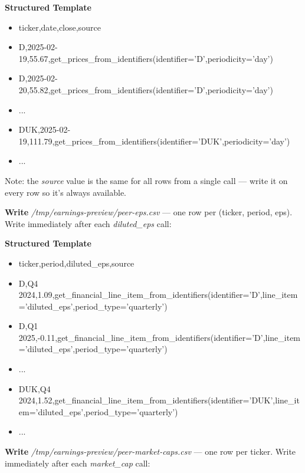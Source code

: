 \documentclass[11pt]{article}
\begin{document}
\textbf{Structured Template}
\begin{itemize}[leftmargin=*,itemsep=2pt,topsep=2pt]
\item {} ticker,date,close,source
\item {} D,2025-02-19,55.67,get\_\allowbreak{}prices\_\allowbreak{}from\_\allowbreak{}identifiers(identifier='D',periodicity='day')
\item {} D,2025-02-20,55.82,get\_\allowbreak{}prices\_\allowbreak{}from\_\allowbreak{}identifiers(identifier='D',periodicity='day')
\item {} ...
\item {} DUK,2025-02-19,111.79,get\_\allowbreak{}prices\_\allowbreak{}from\_\allowbreak{}identifiers(identifier='DUK',periodicity='day')
\item {} ...
\end{itemize}
Note: the \emph{source} value is the same for all rows from a single call — write it on every row so it's always available.


\textbf{Write} \emph{/tmp/earnings-preview/peer-eps.csv} — one row per (ticker, period, eps). Write immediately after each \emph{diluted\_\allowbreak{}eps} call:

\textbf{Structured Template}
\begin{itemize}[leftmargin=*,itemsep=2pt,topsep=2pt]
\item {} ticker,period,diluted\_\allowbreak{}eps,source
\item {} D,Q4 2024,1.09,get\_\allowbreak{}financial\_\allowbreak{}line\_\allowbreak{}item\_\allowbreak{}from\_\allowbreak{}identifiers(identifier='D',line\_\allowbreak{}item='diluted\_\allowbreak{}eps',period\_\allowbreak{}type='quarterly')
\item {} D,Q1 2025,-0.11,get\_\allowbreak{}financial\_\allowbreak{}line\_\allowbreak{}item\_\allowbreak{}from\_\allowbreak{}identifiers(identifier='D',line\_\allowbreak{}item='diluted\_\allowbreak{}eps',period\_\allowbreak{}type='quarterly')
\item {} ...
\item {} DUK,Q4 2024,1.52,get\_\allowbreak{}financial\_\allowbreak{}line\_\allowbreak{}item\_\allowbreak{}from\_\allowbreak{}identifiers(identifier='DUK',line\_\allowbreak{}item='diluted\_\allowbreak{}eps',period\_\allowbreak{}type='quarterly')
\item {} ...
\end{itemize}

\textbf{Write} \emph{/tmp/earnings-preview/peer-market-caps.csv} — one row per ticker. Write immediately after each \emph{market\_\allowbreak{}cap} call:
\end{document}
